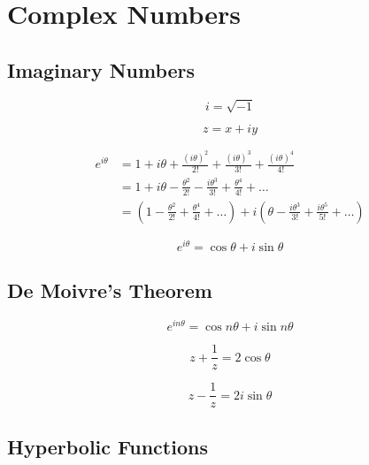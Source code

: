 \chapter{Complex Numbers}

\section{Imaginary Numbers}
\begin{equation*}
    i = \sqrt{-1}
\end{equation*}

\begin{equation*}
    z = x + iy
\end{equation*}

\begin{align*}
    e^{i\theta} &= 1 + i\theta + \frac{(i\theta)^{2}}{2!} + \frac{(i\theta)^{3}}{3!} + \frac{(i\theta)^{4}}{4!}\\
    &= 1 + i\theta - \frac{\theta^{2}}{2!} - \frac{i\theta^{3}}{3!} + \frac{\theta^{4}}{4!} + \dots\\
    &= \left(1 - \frac{\theta^{2}}{2!} + \frac{\theta^{4}}{4!} + \dots\right) + i\left(\theta - \frac{i\theta^{3}}{3!} + \frac{i\theta^{5}}{5!} + \dots\right)
\end{align*}

\begin{equation*}
    e^{i\theta} = \cos\theta + i\sin\theta
\end{equation*}

\section{De Moivre's Theorem}

\begin{equation*}
    e^{in\theta} = \cos n\theta + i \sin n\theta
\end{equation*}

\begin{equation*}
    z + \frac{1}{z} = 2\cos\theta
\end{equation*}

\begin{equation*}
    z - \frac{1}{z} = 2i\sin\theta
\end{equation*}

\section{Hyperbolic Functions}

